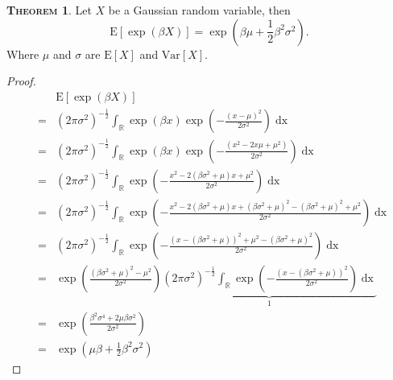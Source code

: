 \documentclass[a4paper, twoside, 11pt]{article}
\theoremstyle{definition}
\newtheorem{theorem}[definition]{\scshape Theorem}
\newcommand{\brkt}[1]{\left({#1} \right)}
\begin{document}
\begin{theorem}
  Let $X$ be a Gaussian random variable, then
  \begin{equation}
	\mathrm{E}[\exp(\beta X)] = \exp(\beta\mu + \frac{1}{2}\beta^2\sigma^2).
	\label{sec:expgau}
  \end{equation}
  Where $\mu$ and $\sigma$ are $\mathrm{E}[X]$ and $\mathrm{Var}[X]$.
\end{theorem}
\begin{proof}
\begin{eqnarray*}
  &&\mathrm{E}[\exp(\beta X)] \\
&=& (2\pi \sigma^2)^{-\frac{1}{2}}\int_\mathbb{R} \exp(\beta x) \exp\brkt{-\frac{(x-\mu)^2}{2\sigma^2}} \mathop{dx}\\
&=& (2\pi \sigma^2)^{-\frac{1}{2}}\int_\mathbb{R} \exp(\beta x) \exp\brkt{-\frac{(x^2- 2x\mu+ \mu^2)}{2\sigma^2}} \mathop{dx}\\
&=& (2\pi \sigma^2)^{-\frac{1}{2}}\int_\mathbb{R} \exp\brkt{-\frac{x^2- 2(\beta\sigma^2+\mu)x+ \mu^2}{2\sigma^2}} \mathop{dx}\\
&=& (2\pi \sigma^2)^{-\frac{1}{2}}\int_\mathbb{R} \exp\brkt{-\frac{x^2- 2(\beta\sigma^2+\mu)x+ (\beta\sigma^2+\mu)^2 -  (\beta\sigma^2+\mu)^2 + \mu^2}{2\sigma^2}} \mathop{dx}\\
&=& (2\pi \sigma^2)^{-\frac{1}{2}}\int_\mathbb{R} \exp\brkt{-\frac{(x- (\beta\sigma^2+\mu))^2+ \mu^2 - (\beta\sigma^2+\mu)^2}{2\sigma^2}} \mathop{dx}\\
&=& \exp\brkt{\frac{(\beta\sigma^2+\mu)^2 - \mu^2}{2\sigma^2}} \underbrace{(2\pi \sigma^2)^{-\frac{1}{2}}\int_\mathbb{R} \exp\brkt{-\frac{(x- (\beta\sigma^2+\mu))^2}{2\sigma^2}}\mathop{dx}}_{1}\\
&=& \exp\brkt{\frac{\beta^2\sigma^4 + 2\mu\beta\sigma^2}{2\sigma^2}}\\
&=& \exp(\mu\beta + \frac{1}{2}\beta^2\sigma^2)
\end{eqnarray*}
\end{proof}
\end{document}
